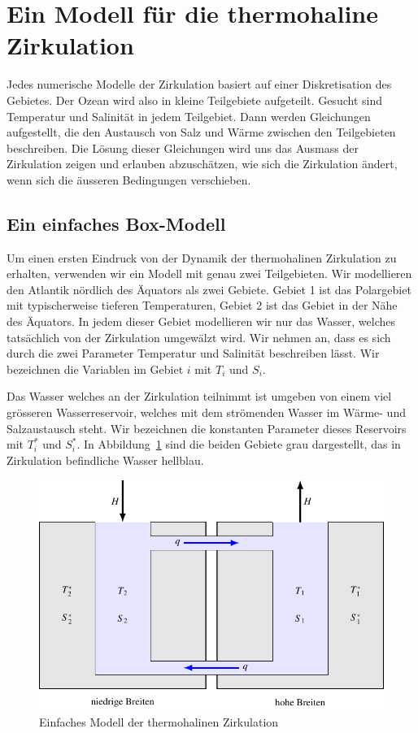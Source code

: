 %
%
%
\section{Ein Modell für die thermohaline Zirkulation}
Jedes numerische Modelle der Zirkulation basiert auf einer Diskretisation
des Gebietes.
Der Ozean wird also in kleine Teilgebiete aufgeteilt.
Gesucht sind Temperatur und Salinität in jedem Teilgebiet.
Dann werden Gleichungen aufgestellt, die den Austausch von Salz und
Wärme zwischen den Teilgebieten beschreiben.
Die Lösung dieser Gleichungen wird uns das Ausmass der Zirkulation zeigen
und erlauben abzuschätzen, wie sich die Zirkulation ändert, wenn sich
die äusseren Bedingungen verschieben.

\subsection{Ein einfaches Box-Modell}
Um einen ersten Eindruck von der Dynamik der thermohalinen Zirkulation
zu erhalten, verwenden wir ein Modell mit genau zwei Teilgebieten.
Wir modellieren den Atlantik nördlich des Äquators als zwei Gebiete.
Gebiet 1 ist das Polargebiet mit typischerweise tieferen Temperaturen,
Gebiet 2 ist das Gebiet in der Nähe des Äquators.
In jedem dieser Gebiet modellieren wir nur das Wasser, welches tatsächlich
von der Zirkulation umgewälzt wird.
Wir nehmen an, dass es sich durch die zwei Parameter Temperatur und
Salinität beschreiben lässt.
Wir bezeichnen die Variablen im Gebiet $i$ mit $T_i$ und $S_i$.

Das Wasser welches an der Zirkulation teilnimmt ist umgeben von einem
viel grösseren Wasserreservoir, welches mit dem strömenden Wasser 
im Wärme- und Salzaustausch steht.
Wir bezeichnen die konstanten Parameter dieses Reservoirs mit
$T_i^*$ und $S_i^*$.
In Abbildung~\ref{skript:boxmodell-bild} sind die beiden Gebiete
grau dargestellt, das in Zirkulation befindliche Wasser hellblau.
\begin{figure}
\centering
\includegraphics{chapters/4/boxmodell.pdf}
\caption{Einfaches Modell der thermohalinen Zirkulation
\label{skript:boxmodell-bild}}
\end{figure}

